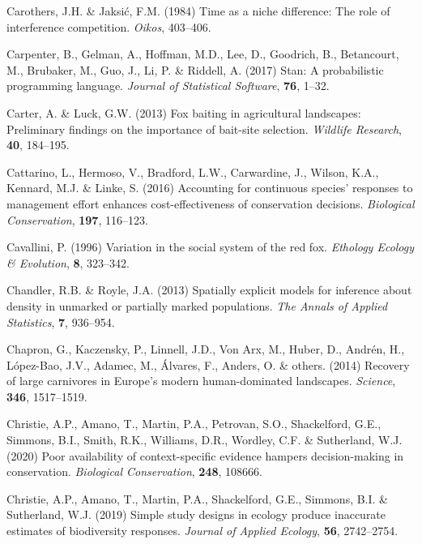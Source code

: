 \documentclass[11pt,a4paper,titlepage,twoside,openright]{style/unimelbthesis}
\begin{document}
\begin{mainmatter}
\leavevmode\hypertarget{ref-carothers1984time}{}%
Carothers, J.H. \& Jaksić, F.M. (1984) Time as a niche difference: The role of interference competition. \emph{Oikos}, 403--406.

\leavevmode\hypertarget{ref-carpenter2017stan}{}%
Carpenter, B., Gelman, A., Hoffman, M.D., Lee, D., Goodrich, B., Betancourt, M., Brubaker, M., Guo, J., Li, P. \& Riddell, A. (2017) Stan: A probabilistic programming language. \emph{Journal of Statistical Software}, \textbf{76}, 1--32.

\leavevmode\hypertarget{ref-carter2013fox}{}%
Carter, A. \& Luck, G.W. (2013) Fox baiting in agricultural landscapes: Preliminary findings on the importance of bait-site selection. \emph{Wildlife Research}, \textbf{40}, 184--195.

\leavevmode\hypertarget{ref-cattarino2016accounting}{}%
Cattarino, L., Hermoso, V., Bradford, L.W., Carwardine, J., Wilson, K.A., Kennard, M.J. \& Linke, S. (2016) Accounting for continuous species' responses to management effort enhances cost-effectiveness of conservation decisions. \emph{Biological Conservation}, \textbf{197}, 116--123.

\leavevmode\hypertarget{ref-cavallini1996variation}{}%
Cavallini, P. (1996) Variation in the social system of the red fox. \emph{Ethology Ecology \& Evolution}, \textbf{8}, 323--342.

\leavevmode\hypertarget{ref-chandler2013spatially}{}%
Chandler, R.B. \& Royle, J.A. (2013) Spatially explicit models for inference about density in unmarked or partially marked populations. \emph{The Annals of Applied Statistics}, \textbf{7}, 936--954.

\leavevmode\hypertarget{ref-chapron2014recovery}{}%
Chapron, G., Kaczensky, P., Linnell, J.D., Von Arx, M., Huber, D., Andrén, H., López-Bao, J.V., Adamec, M., Álvares, F., Anders, O. \& others. (2014) Recovery of large carnivores in Europe's modern human-dominated landscapes. \emph{Science}, \textbf{346}, 1517--1519.

\leavevmode\hypertarget{ref-christie2020poor}{}%
Christie, A.P., Amano, T., Martin, P.A., Petrovan, S.O., Shackelford, G.E., Simmons, B.I., Smith, R.K., Williams, D.R., Wordley, C.F. \& Sutherland, W.J. (2020) Poor availability of context-specific evidence hampers decision-making in conservation. \emph{Biological Conservation}, \textbf{248}, 108666.

\leavevmode\hypertarget{ref-christie2019simple}{}%
Christie, A.P., Amano, T., Martin, P.A., Shackelford, G.E., Simmons, B.I. \& Sutherland, W.J. (2019) Simple study designs in ecology produce inaccurate estimates of biodiversity responses. \emph{Journal of Applied Ecology}, \textbf{56}, 2742--2754.


\end{mainmatter}
\end{document}
